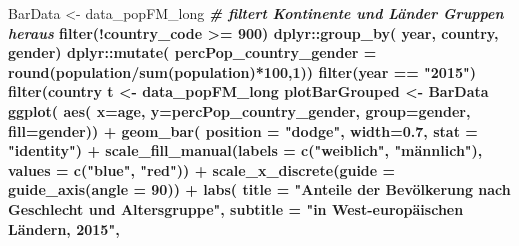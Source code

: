\documentclass[
]{article}
\newenvironment{Shaded}{\begin{snugshade}}{\end{snugshade}}
\newcommand{\CommentTok}[1]{\textcolor[rgb]{0.56,0.35,0.01}{\textit{#1}}}
\newcommand{\DataTypeTok}[1]{\textcolor[rgb]{0.13,0.29,0.53}{#1}}
\newcommand{\DecValTok}[1]{\textcolor[rgb]{0.00,0.00,0.81}{#1}}
\newcommand{\FloatTok}[1]{\textcolor[rgb]{0.00,0.00,0.81}{#1}}
\newcommand{\KeywordTok}[1]{\textcolor[rgb]{0.13,0.29,0.53}{\textbf{#1}}}
\newcommand{\NormalTok}[1]{#1}
\newcommand{\OperatorTok}[1]{\textcolor[rgb]{0.81,0.36,0.00}{\textbf{#1}}}
\newcommand{\StringTok}[1]{\textcolor[rgb]{0.31,0.60,0.02}{#1}}
\begin{document}
\begin{Shaded}
\begin{Highlighting}[]
\NormalTok{BarData <-}\StringTok{ }\NormalTok{data_popFM_long }\OperatorTok{%
\StringTok{  }\CommentTok{# filtert Kontinente und Länder Gruppen heraus}
\StringTok{  }\KeywordTok{filter}\NormalTok{(}\OperatorTok{!}\NormalTok{country_code }\OperatorTok{>=}\StringTok{ }\DecValTok{900}\NormalTok{) }\OperatorTok{%
\StringTok{  }\NormalTok{dplyr}\OperatorTok{::}\KeywordTok{group_by}\NormalTok{(}
\NormalTok{    year,}
\NormalTok{    country,}
\NormalTok{    gender) }\OperatorTok{%
\StringTok{  }\NormalTok{dplyr}\OperatorTok{::}\KeywordTok{mutate}\NormalTok{(}
    \DataTypeTok{percPop_country_gender =} \KeywordTok{round}\NormalTok{(population}\OperatorTok{/}\KeywordTok{sum}\NormalTok{(population)}\OperatorTok{*}\DecValTok{100}\NormalTok{,}\DecValTok{1}\NormalTok{)) }\OperatorTok{%
\StringTok{  }\KeywordTok{filter}\NormalTok{(year }\OperatorTok{==}\StringTok{ "2015"}\NormalTok{) }\OperatorTok{%
\StringTok{  }\KeywordTok{filter}\NormalTok{(country }\OperatorTok{%
\NormalTok{t <-}\StringTok{ }\NormalTok{data_popFM_long }\OperatorTok{%
\NormalTok{plotBarGrouped <-}\StringTok{ }\NormalTok{BarData }\OperatorTok{%
\StringTok{    }\KeywordTok{ggplot}\NormalTok{( }
      \KeywordTok{aes}\NormalTok{(}
        \DataTypeTok{x=}\NormalTok{age, }
        \DataTypeTok{y=}\NormalTok{percPop_country_gender, }
        \DataTypeTok{group=}\NormalTok{gender, }
        \DataTypeTok{fill=}\NormalTok{gender)) }\OperatorTok{+}
\StringTok{    }\KeywordTok{geom_bar}\NormalTok{(}
      \DataTypeTok{position =} \StringTok{"dodge"}\NormalTok{, }\DataTypeTok{width=}\FloatTok{0.7}\NormalTok{,}
      \DataTypeTok{stat =} \StringTok{"identity"}\NormalTok{) }\OperatorTok{+}
\StringTok{    }\KeywordTok{scale_fill_manual}\NormalTok{(}\DataTypeTok{labels =} \KeywordTok{c}\NormalTok{(}\StringTok{"weiblich"}\NormalTok{, }\StringTok{"männlich"}\NormalTok{), }\DataTypeTok{values =} \KeywordTok{c}\NormalTok{(}\StringTok{"blue"}\NormalTok{, }\StringTok{"red"}\NormalTok{)) }\OperatorTok{+}
\StringTok{    }\KeywordTok{scale_x_discrete}\NormalTok{(}\DataTypeTok{guide =} \KeywordTok{guide_axis}\NormalTok{(}\DataTypeTok{angle =} \DecValTok{90}\NormalTok{)) }\OperatorTok{+}
\StringTok{    }\KeywordTok{labs}\NormalTok{(}
      \DataTypeTok{title =} \StringTok{"Anteile der Bevölkerung nach Geschlecht und Altersgruppe"}\NormalTok{,}
      \DataTypeTok{subtitle =} \StringTok{"in West-europäischen Ländern, 2015"}\NormalTok{,}
}}}}}}}}
\end{Highlighting}
\end{Shaded}
\end{document}

